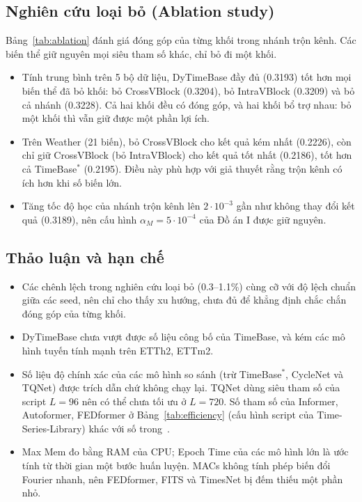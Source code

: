 \documentclass[12pt,a4paper]{report}
\numberwithin{equation}{chapter}
\begin{document}
\subsection{Nghiên cứu loại bỏ (Ablation study)}

Bảng~\ref{tab:ablation} đánh giá đóng góp của từng khối trong nhánh trộn kênh. Các biến thể giữ nguyên mọi siêu tham số
khác, chỉ bỏ đi một khối.



\begin{itemize}
  \item Tính trung bình trên 5 bộ dữ liệu, DyTimeBase đầy đủ (0.3193) tốt hơn mọi biến thể đã bỏ khối: bỏ CrossVBlock
        (0.3204), bỏ IntraVBlock (0.3209) và bỏ cả nhánh (0.3228). Cả hai khối đều có đóng góp, và hai khối bổ trợ
        nhau: bỏ một khối thì vẫn giữ được một phần lợi ích.
  \item Trên Weather (21 biến), bỏ CrossVBlock cho kết quả kém nhất (0.2226), còn chỉ giữ CrossVBlock (bỏ IntraVBlock)
        cho kết quả tốt nhất (0.2186), tốt hơn cả TimeBase$^{*}$ (0.2195). Điều này phù hợp với giả thuyết rằng trộn kênh
        có ích hơn khi số biến lớn.
  \item Tăng tốc độ học của nhánh trộn kênh lên $2\cdot10^{-3}$ gần như không thay đổi kết quả (0.3189), nên cấu hình
        $\alpha_M=5\cdot10^{-4}$ của Đồ án I được giữ nguyên.
\end{itemize}

\subsection{Thảo luận và hạn chế}

\begin{itemize}
  \item Các chênh lệch trong nghiên cứu loại bỏ (0.3--1.1\%) cùng cỡ với độ lệch chuẩn giữa các seed, nên chỉ cho thấy xu
        hướng, chưa đủ để khẳng định chắc chắn đóng góp của từng khối.
  \item DyTimeBase chưa vượt được số liệu công bố của TimeBase, và kém các mô hình tuyến tính mạnh trên ETTh2, ETTm2.
  \item Số liệu độ chính xác của các mô hình so sánh (trừ TimeBase$^{*}$, CycleNet và TQNet) được trích dẫn chứ không chạy
        lại. TQNet dùng siêu tham số của script $L=96$ nên có thể chưa tối ưu ở $L=720$. Số tham số của Informer,
        Autoformer, FEDformer ở Bảng~\ref{tab:efficiency} (cấu hình script của Time-Series-Library) khác với số
        trong~\cite{timebase}.
  \item Max Mem đo bằng RAM của CPU; Epoch Time của các mô hình lớn là ước tính từ thời gian một bước huấn luyện. MACs
        không tính phép biến đổi Fourier nhanh, nên FEDformer, FITS và TimesNet bị đếm thiếu một phần nhỏ.
\end{itemize}
\end{document}
